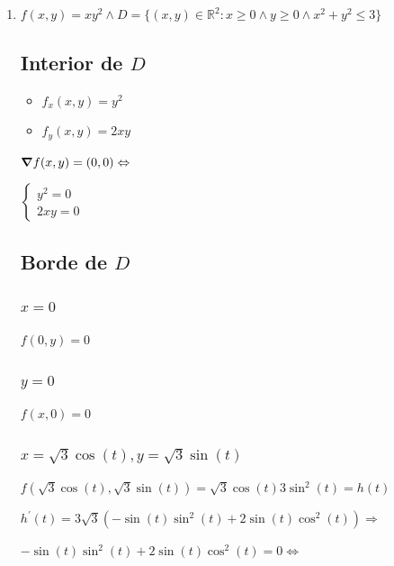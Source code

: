 \documentclass[../practica_06.tex]{subfiles}
\begin{document}
\begin{enumerate}
        \item $f(x,y) = xy^2 \wedge D=\{(x,y) \in \mathbb{R}^2: x \geq 0 \wedge y \geq 0 \wedge x^2+y^2 \leq 3 \}$
        
            \subsection*{Interior de $D$}

            \begin{itemize}
                \item $f_x(x,y) = y^2$
                \item $f_y(x,y) = 2xy$
            \end{itemize}

            $\grad f(x,y) = (0,0) \Leftrightarrow$
            
            $\left\{ \begin{array}{ll}
                y^2 = 0 \\
                2xy = 0
            \end{array}\right.$

            \subsection*{Borde de $D$}

            \subsubsection*{$x=0$}

                $f(0,y) = 0$

            \subsubsection*{$y=0$}

                $f(x,0) = 0$

            \subsubsection*{$x=\sqrt{3}\cos(t),y=\sqrt{3}\sin(t)$}

                $f(\sqrt{3}\cos(t),\sqrt{3}\sin(t)) = \sqrt{3}\cos(t)3\sin^2(t) = h(t)$

                $h^{\prime}(t) =  3\sqrt{3}(-\sin(t)\sin^2(t) + 2\sin(t)\cos^2(t)) \Rightarrow $

                $ -\sin(t)\sin^2(t) + 2\sin(t)\cos^2(t) = 0 \Leftrightarrow $


\end{enumerate}
\end{document}

